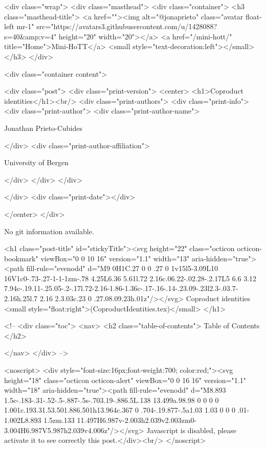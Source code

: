     <div class="wrap">
      <div class="masthead">
        <div class="container">
          <h3 class="masthead-title">
            <a href=""><img alt="@jonaprieto" class="avatar float-left mr-1" src="https://avatars3.githubusercontent.com/u/1428088?s=40&amp;v=4" height="20" width="20"></a>
            <a href="/mini-hott/" title="Home">Mini-HoTT</a>
            <small style="text-decoration:left"></small>
          </h3>
        </div>
      
      <div class="container content">
        







<div class="post">
  <div class="print-version">
    <center>
      <h1>Coproduct identities</h1><br/>
        <div class="print-authors">
          <div class="print-info">
            <div class="print-author">
              <div class="print-author-name">
                
                  Jonathan Prieto-Cubides
                
              </div>
              <div class="print-author-affiliation">
                
                  University of Bergen
                
                </div>
            </div>
          </div>
          
          
        </div>
        <div class="print-date"></div>
        
        
    </center>
  </div>

  
  No git information available.
  

  <h1 class="post-title" id="stickyTitle"><svg height="22" class="octicon octicon-bookmark" viewBox="0 0 10 16" version="1.1" width="13" aria-hidden="true"><path fill-rule="evenodd" d="M9 0H1C.27 0 0 .27 0 1v15l5-3.09L10 16V1c0-.73-.27-1-1-1zm-.78 4.25L6.36 5.61l.72 2.16c.06.22-.02.28-.2.17L5 6.6 3.12 7.94c-.19.11-.25.05-.2-.17l.72-2.16-1.86-1.36c-.17-.16-.14-.23.09-.23l2.3-.03.7-2.16h.25l.7 2.16 2.3.03c.23 0 .27.08.09.23h.01z"/></svg> Coproduct identities <small style="float:right">(CoproductIdentities.tex)</small>
  </h1>

  <!-- 
  <div class="toc">
    <nav>
    <h2 class="table-of-contents"> Table of Contents </h2>
      

    </nav>
  </div>
   -->

  <noscript>
  <div style="font-size:16px;font-weight:700; color:red;"><svg height="18" class="octicon octicon-alert" viewBox="0 0 16 16" version="1.1" width="18" aria-hidden="true"><path fill-rule="evenodd" d="M8.893 1.5c-.183-.31-.52-.5-.887-.5s-.703.19-.886.5L.138 13.499a.98.98 0 0 0 0 1.001c.193.31.53.501.886.501h13.964c.367 0 .704-.19.877-.5a1.03 1.03 0 0 0 .01-1.002L8.893 1.5zm.133 11.497H6.987v-2.003h2.039v2.003zm0-3.004H6.987V5.987h2.039v4.006z"/></svg> Javascript is disabled, please activate it to see correctly this post.</div><br/>
  </noscript>

